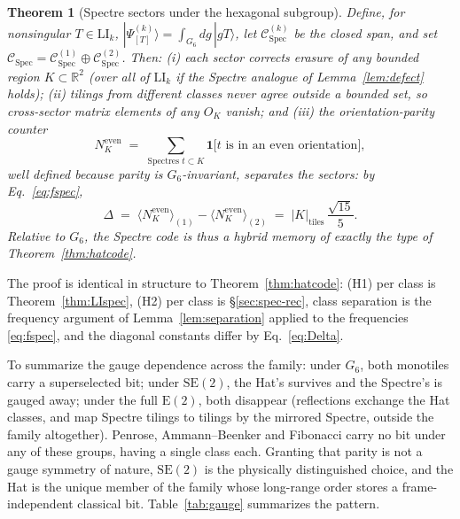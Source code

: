 \documentclass[a4paper,unpublished]{quantumarticle}
\newtheorem{theorem}{Theorem}
\theoremstyle{remark}
\newcommand{\CSpec}{\mathcal{C}_{\mathrm{Spec}}}
\newcommand{\RR}{\mathbb{R}}
\newcommand{\Etwo}{\mathrm{E}(2)}
\newcommand{\SEtwo}{\mathrm{SE}(2)}
\newcommand{\LI}{\mathrm{LI}}
\begin{document}
\begin{theorem}[Spectre sectors under the hexagonal subgroup]
\label{thm:spec-sector}
Define, for nonsingular $T \in \LI_{k}$,
$|\Psi^{(k)}_{[T]}\rangle = \int_{G_{6}} dg\, |gT\rangle$, let
$\CSpec^{(k)}$ be the closed span, and set
$\CSpec = \CSpec^{(1)} \oplus \CSpec^{(2)}$. Then:
(i) each sector corrects erasure of any bounded region
$K \subset \RR^{2}$ (over all of $\LI_{k}$ if the Spectre analogue
of Lemma~\ref{lem:defect} holds);
(ii) tilings from different classes never agree outside a bounded
set, so cross-sector matrix elements of any $O_{K}$ vanish; and
(iii) the orientation-parity counter
\[
N^{\mathrm{even}}_{K} \;=\;
\sum_{\text{Spectres } t \subset K}
\mathbf{1}\bigl[ t \text{ is in an even orientation} \bigr] ,
\]
well defined because parity is $G_{6}$-invariant, separates the
sectors: by Eq.~\eqref{eq:fspec},
\begin{equation}
\Delta \;=\;
\bigl\langle N^{\mathrm{even}}_{K} \bigr\rangle_{(1)} -
\bigl\langle N^{\mathrm{even}}_{K} \bigr\rangle_{(2)}
\;=\; |K|_{\mathrm{tiles}}\, \frac{\sqrt{15}}{5} .
\label{eq:Delta}
\end{equation}
Relative to $G_{6}$, the Spectre code is thus a hybrid memory of
exactly the type of Theorem~\ref{thm:hatcode}.
\end{theorem}

The proof is identical in structure to Theorem~\ref{thm:hatcode}:
(H1) per class is Theorem~\ref{thm:LIspec}, (H2) per class is
\S\ref{sec:spec-rec}, class separation is the frequency argument of
Lemma~\ref{lem:separation} applied to the frequencies
\eqref{eq:fspec}, and the diagonal constants differ by
Eq.~\eqref{eq:Delta}.

To summarize the gauge dependence across the family: under $G_{6}$,
both monotiles carry a superselected bit; under $\SEtwo$, the Hat's
survives and the Spectre's is gauged away; under the full $\Etwo$,
both disappear (reflections exchange the Hat classes, and map Spectre
tilings to tilings by the mirrored Spectre, outside the family
altogether). Penrose, Ammann--Beenker and Fibonacci carry no bit
under any of these groups, having a single class each. Granting that
parity is not a gauge symmetry of nature, $\SEtwo$ is the physically
distinguished choice, and the Hat is the unique member of the family
whose long-range order stores a frame-independent classical bit.
Table~\ref{tab:gauge} summarizes the pattern.
\end{document}
